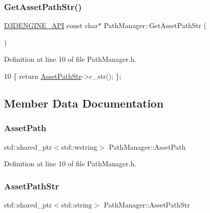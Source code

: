 \subsubsection{\texorpdfstring{Get\+Asset\+Path\+Str()}{GetAssetPathStr()}}
{\footnotesize\ttfamily \mbox{\hyperlink{stdafx_8h_a8ee2d990c5dfba7794dd2b60741d7722}{D3\+D\+E\+N\+G\+I\+N\+E\+\_\+\+A\+PI}} const char$\ast$ Path\+Manager\+::\+Get\+Asset\+Path\+Str (\begin{DoxyParamCaption}{ }\end{DoxyParamCaption})\hspace{0.3cm}{\ttfamily [inline]}}



Definition at line 10 of file Path\+Manager.\+h.


\begin{DoxyCode}
10 \{ \textcolor{keywordflow}{return} \mbox{\hyperlink{class_path_manager_ad037448c8b23e1c60c89ad7d3e188d3a}{AssetPathStr}}->c\_str(); \};
\end{DoxyCode}


\subsection{Member Data Documentation}
\mbox{\label{class_path_manager_aa10cc8c03331c77828bf9e155644d018}} 
\subsubsection{\texorpdfstring{Asset\+Path}{AssetPath}}
{\footnotesize\ttfamily std\+::shared\+\_\+ptr$<$std\+::wstring$>$ Path\+Manager\+::\+Asset\+Path\hspace{0.3cm}{\ttfamily [private]}}



Definition at line 10 of file Path\+Manager.\+h.

\mbox{\label{class_path_manager_ad037448c8b23e1c60c89ad7d3e188d3a}} 
\subsubsection{\texorpdfstring{Asset\+Path\+Str}{AssetPathStr}}
{\footnotesize\ttfamily std\+::shared\+\_\+ptr$<$std\+::string$>$ Path\+Manager\+::\+Asset\+Path\+Str\hspace{0.3cm}{\ttfamily [private]}}



